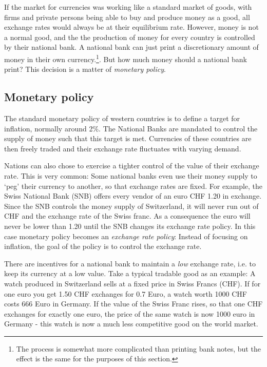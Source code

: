 If the market for currencies was working like a standard market of goods, with firms and private persons being able to buy and produce money as a good, 
all exchange rates would always be at their equilibrium rate. However, money is not a normal good, and the 
the production of money for every country is controlled by their 
national bank. A national bank can just print a 
discretionary amount of money in their own currency.\footnote{The 
process is somewhat more complicated than printing bank notes, but the 
effect is the same for the purposes of this section.}. But how much money should a national bank print? This decision is a matter of \emph{monetary policy}. 

\subsection{Monetary policy}

The standard monetary policy of western countries is to define a target 
for inflation, normally around 2\%. The National Banks are mandated to 
control the supply of money such that this target is met. Currencies of 
these countries are then freely traded and their exchange rate 
fluctuates with varying demand. 

Nations can also chose to exercise a tighter control of the value of 
their exchange rate.  This is very common: Some national banks even use 
their money supply to `peg' their currency to another, so that exchange 
rates are fixed.  For example, the Swiss National Bank (SNB) offers 
every vendor of an euro CHF 1.20 in exchange.  Since the SNB controls 
the money supply of Switzerland, it will never run out of CHF and the 
exchange rate of the Swiss franc. As a consequence the euro will never 
be lower than 1.20 until the SNB changes its exchange rate policy. In 
this case monetary policy becomes an \emph{exchange rate policy}: Instead of 
focusing on inflation, the goal of the policy is to control the exchange 
rate.

There are incentives for a national bank to maintain a \emph{low} exchange rate, i.e. to keep its currency at a low value. Take a typical tradable good as an example: A watch produced in Switzerland sells at a fixed price in Swiss Francs (CHF). If for one euro you get 1.50 CHF exchanges for 0.7 Euro, a watch worth 1000 CHF costs 666 Euro in Germany. If the value of the Swiss Franc rises, so that one CHF exchanges for exactly one euro, the price of the same watch is now 1000 euro in Germany - this watch is now a much less competitive good on the world market.

